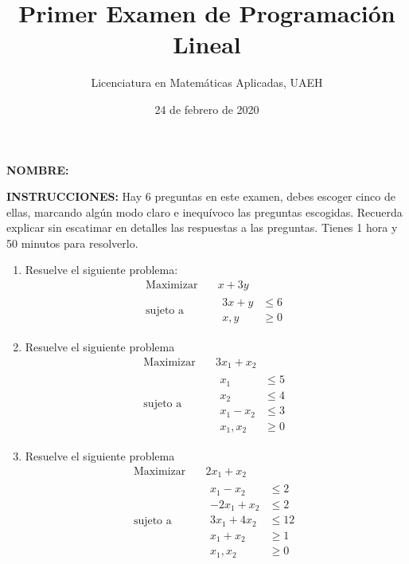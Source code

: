 \documentclass[twocolumn]{article}
\author{Licenciatura en Matemáticas Aplicadas, UAEH}
\date{24 de febrero de 2020}
\title{Primer Examen de Programación Lineal}
\begin{document}
\maketitle
\thispagestyle{empty}

\textbf{NOMBRE:}
\hrulefill

\medskip

\textbf{INSTRUCCIONES:} Hay 6 preguntas en este examen, debes escoger cinco
de ellas, marcando algún modo claro e inequívoco las preguntas
escogidas. Recuerda explicar sin escatimar en detalles las respuestas
a las preguntas. Tienes 1 hora y 50 minutos para resolverlo.

\begin{enumerate}
\item Resuelve el siguiente problema:
\begin{equation*}
\begin{aligned}
\text{Maximizar} \quad & x+3y\\
\text{sujeto a} \quad &
  \begin{aligned}
   3x+y &\leq 6\\
   x,y &\geq  0
  \end{aligned}
\end{aligned}
\end{equation*}



\item Resuelve el siguiente problema 
\begin{equation*}
 \begin{aligned}
\text{Maximizar} \quad & 3x_{1}+x_{2}\\
\text{sujeto a} \quad &
  \begin{aligned}
   x_{1} &\leq 5\\
   x_{2} &\leq 4\\
   x_{1}-x_{2} &\leq 3\\
    x_{1},x_{2} &\geq 0
  \end{aligned}
\end{aligned}
\end{equation*}

\item Resuelve el siguiente problema 
\begin{equation*}
 \begin{aligned}
\text{Maximizar} \quad & 2x_{1}+x_{2}\\
\text{sujeto a} \quad &
  \begin{aligned}
   x_{1}-x_{2} &\leq 2\\
   -2x_{1}+x_{2} &\leq 2\\
   3x_{1}+4x_{2} &\leq 12\\
   x_{1}+x_{2} &\geq 1\\
    x_{1},x_{2} &\geq 0
  \end{aligned}
\end{aligned}
\end{equation*}


\end{enumerate}
\end{document}
